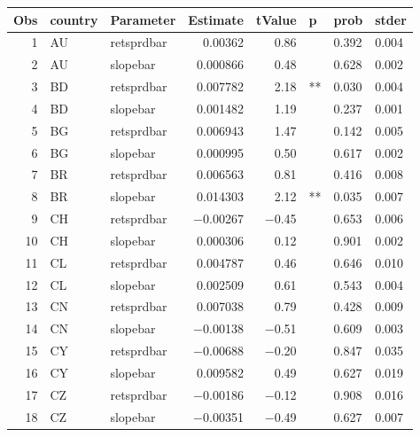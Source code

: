 

\begin{longtable}{|r|l|l|r|r|l|l|l|}\hline
   Obs &    country &    Parameter &    Estimate &    tValue &    p &    prob &    stder\\\hline
\endhead
   1 &    AU &    retsprdbar &    0.00362 &    0.86 &      &    0.392 &    0.004\\\hline
   2 &    AU &    slopebar &    0.000866 &    0.48 &      &    0.628 &    0.002\\\hline
   3 &    BD &    retsprdbar &    0.007782 &    2.18 &    ** &    0.030 &    0.004\\\hline
   4 &    BD &    slopebar &    0.001482 &    1.19 &      &    0.237 &    0.001\\\hline
   5 &    BG &    retsprdbar &    0.006943 &    1.47 &      &    0.142 &    0.005\\\hline
   6 &    BG &    slopebar &    0.000995 &    0.50 &      &    0.617 &    0.002\\\hline
   7 &    BR &    retsprdbar &    0.006563 &    0.81 &      &    0.416 &    0.008\\\hline
   8 &    BR &    slopebar &    0.014303 &    2.12 &    ** &    0.035 &    0.007\\\hline
   9 &    CH &    retsprdbar &    $-$0.00267 &    $-$0.45 &      &    0.653 &    0.006\\\hline
   10 &    CH &    slopebar &    0.000306 &    0.12 &      &    0.901 &    0.002\\\hline
   11 &    CL &    retsprdbar &    0.004787 &    0.46 &      &    0.646 &    0.010\\\hline
   12 &    CL &    slopebar &    0.002509 &    0.61 &      &    0.543 &    0.004\\\hline
   13 &    CN &    retsprdbar &    0.007038 &    0.79 &      &    0.428 &    0.009\\\hline
   14 &    CN &    slopebar &    $-$0.00138 &    $-$0.51 &      &    0.609 &    0.003\\\hline
   15 &    CY &    retsprdbar &    $-$0.00688 &    $-$0.20 &      &    0.847 &    0.035\\\hline
   16 &    CY &    slopebar &    0.009582 &    0.49 &      &    0.627 &    0.019\\\hline
   17 &    CZ &    retsprdbar &    $-$0.00186 &    $-$0.12 &      &    0.908 &    0.016\\\hline
   18 &    CZ &    slopebar &    $-$0.00351 &    $-$0.49 &      &    0.627 &    0.007\\\hline

\end{longtable}
